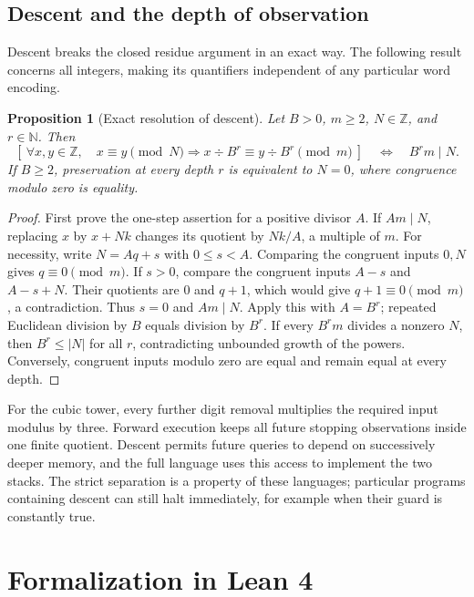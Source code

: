 \documentclass[11pt]{article}
\numberwithin{equation}{section}
\newtheorem{proposition}[theorem]{Proposition}
\theoremstyle{definition}
\theoremstyle{remark}
\newcommand{\N}{\mathbb N}
\newcommand{\Z}{\mathbb Z}
\begin{document}
\subsection{Descent and the depth of observation}

Descent breaks the closed residue argument in an exact way. The
following result concerns all integers, making its quantifiers
independent of any particular word encoding.

\begin{proposition}[Exact resolution of descent]\label{prop:resolution}
Let $B>0$, $m\geq2$, $N\in\Z$, and $r\in\N$. Then
\begin{equation}\label{eq:resolution}
 \left[\ \forall x,y\in\Z,\quad x\equiv y\pmod N
       \Longrightarrow
       x\div B^r\equiv y\div B^r\pmod m\ \right]
 \quad\Longleftrightarrow\quad B^r m\mid N.
\end{equation}
If $B\geq2$, preservation at every depth $r$ is equivalent to $N=0$,
where congruence modulo zero is equality.
\end{proposition}
\begin{proof}
First prove the one-step assertion for a positive divisor $A$.
If $Am\mid N$, replacing $x$ by $x+Nk$ changes its quotient by
$Nk/A$, a multiple of $m$. For necessity, write
$N=Aq+s$ with $0\leq s<A$. Comparing the congruent inputs $0,N$
gives $q\equiv0\pmod m$. If $s>0$, compare the congruent inputs
$A-s$ and $A-s+N$. Their quotients are $0$ and $q+1$, which
would give $q+1\equiv0\pmod m$, a contradiction. Thus $s=0$
and $Am\mid N$. Apply this with $A=B^r$; repeated Euclidean
division by $B$ equals division by $B^r$.
If every $B^rm$ divides a nonzero $N$, then $B^r\leq|N|$ for
all $r$, contradicting unbounded growth of the powers. Conversely,
congruent inputs modulo zero are equal and remain equal at every depth.
\end{proof}

For the cubic tower, every further digit removal multiplies the
required input modulus by three. Forward execution keeps all future
stopping observations inside one finite quotient. Descent permits
future queries to depend on successively deeper memory, and the full
language uses this access to implement the two stacks. The strict
separation is a property of these languages; particular programs
containing descent can still halt immediately, for example when their
guard is constantly true.

\section{Formalization in Lean 4}
\label{sec:formalization}
\end{document}
